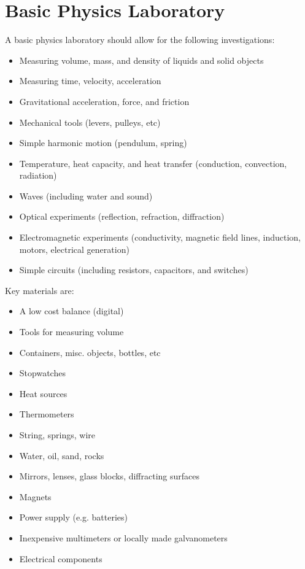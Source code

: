 \section{Basic Physics Laboratory}

A basic physics laboratory should allow for the following investigations:
\begin{itemize}
\item{Measuring volume, mass, and density of liquids and solid objects}
\item{Measuring time, velocity, acceleration}
\item{Gravitational acceleration, force, and friction}
\item{Mechanical tools (levers, pulleys, etc)}
\item{Simple harmonic motion (pendulum, spring)}
\item{Temperature, heat capacity, and heat transfer 
(conduction, convection, radiation)}
\item{Waves (including water and sound)}
\item{Optical experiments (reflection, refraction, diffraction)}
\item{Electromagnetic experiments 
(conductivity, magnetic field lines, 
induction, motors, electrical generation)}
\item{Simple circuits (including resistors, capacitors, and switches)}
\end{itemize}

Key materials are:
\begin{itemize}
\item{A low cost balance (digital)}
\item{Tools for measuring volume}
\item{Containers, misc. objects, bottles, etc}
\item{Stopwatches}
\item{Heat sources}
\item{Thermometers}
\item{String, springs, wire}
\item{Water, oil, sand, rocks}
\item{Mirrors, lenses, glass blocks, diffracting surfaces}
\item{Magnets}
\item{Power supply (e.g. batteries)}
\item{Inexpensive multimeters or locally made galvanometers}
\item{Electrical components}
\end{itemize}
